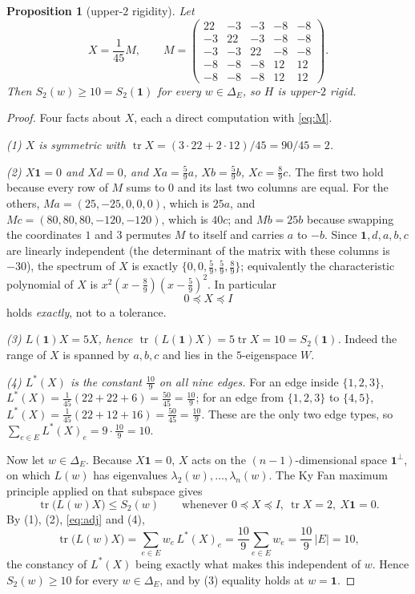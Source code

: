 \documentclass[11pt]{amsart}
\newtheorem{proposition}[theorem]{Proposition}
\theoremstyle{remark}
\DeclareMathOperator{\tr}{tr}
\newcommand{\DeltaE}{\Delta_E}
\newcommand{\Lop}{L}
\newcommand{\Ladj}{L^{*}}
\begin{document}
\begin{proposition}[upper-$2$ rigidity]\label{prop:upper2}
Let
\begin{equation}\label{eq:M}
 X=\frac{1}{45}M,
 \qquad
 M=\begin{pmatrix}
  22 & -3 & -3 & -8 & -8\\
  -3 & 22 & -3 & -8 & -8\\
  -3 & -3 & 22 & -8 & -8\\
  -8 & -8 & -8 & 12 & 12\\
  -8 & -8 & -8 & 12 & 12
 \end{pmatrix}.
\end{equation}
Then $S_2(w)\ge10=S_2(\mathbf 1)$ for every $w\in\DeltaE$, so $H$ is upper-$2$ rigid.
\end{proposition}

\begin{proof}
Four facts about $X$, each a direct computation with \eqref{eq:M}.

\emph{(1) $X$ is symmetric with $\tr X=(3\cdot22+2\cdot12)/45=90/45=2$.}

\emph{(2) $X\mathbf 1=0$ and $Xd=0$, and $Xa=\tfrac59a$, $Xb=\tfrac59b$,
$Xc=\tfrac89c$.} The first two hold because every row of $M$ sums to $0$ and its last two
columns are equal. For the others, $Ma=(25,-25,0,0,0)$, which is $25a$, and
$Mc=(80,80,80,-120,-120)$, which is $40c$; and $Mb=25b$ because swapping the coordinates
$1$ and $3$ permutes $M$ to itself and carries $a$ to $-b$. Since $\mathbf 1,d,a,b,c$ are linearly
independent (the determinant of the matrix with these columns is $-30$), the spectrum of
$X$ is exactly $\{0,0,\tfrac59,\tfrac59,\tfrac89\}$; equivalently the characteristic
polynomial of $X$ is $x^2(x-\tfrac89)(x-\tfrac59)^2$. In particular
\[
 0\preceq X\preceq I
\]
holds \emph{exactly}, not to a tolerance.

\emph{(3) $\Lop(\mathbf 1)X=5X$, hence $\tr(\Lop(\mathbf 1)X)=5\tr X=10=S_2(\mathbf 1)$.}
Indeed the range of $X$ is spanned by $a,b,c$ and lies in the $5$-eigenspace $W$.

\emph{(4) $\Ladj(X)$ is the constant $\tfrac{10}{9}$ on all nine edges.} For an edge inside
$\{1,2,3\}$, $\Ladj(X)=\tfrac{1}{45}(22+22+6)=\tfrac{50}{45}=\tfrac{10}{9}$; for an edge
from $\{1,2,3\}$ to $\{4,5\}$, $\Ladj(X)=\tfrac{1}{45}(22+12+16)=\tfrac{50}{45}=\tfrac{10}{9}$.
These are the only two edge types, so
$\sum_{e\in E}\Ladj(X)_e=9\cdot\tfrac{10}{9}=10$.

Now let $w\in\DeltaE$. Because $X\mathbf 1=0$, $X$ acts on the $(n-1)$-dimensional space
$\mathbf 1^{\perp}$, on which $\Lop(w)$ has eigenvalues $\lambda_2(w),\dots,\lambda_n(w)$.
The Ky Fan maximum principle \cite{Fan} applied on that subspace gives
\[
 \tr\bigl(\Lop(w)X\bigr)\le S_2(w)
 \qquad\text{whenever } 0\preceq X\preceq I,\ \tr X=2,\ X\mathbf 1=0 .
\]
By (1), (2), \eqref{eq:adj} and (4),
\[
 \tr\bigl(\Lop(w)X\bigr)=\sum_{e\in E}w_e\,\Ladj(X)_e=\frac{10}{9}\sum_{e\in E}w_e
 =\frac{10}{9}\,|E|=10 ,
\]
the constancy of $\Ladj(X)$ being exactly what makes this independent of $w$. Hence
$S_2(w)\ge10$ for every $w\in\DeltaE$, and by (3) equality holds at $w=\mathbf 1$.
\end{proof}
\end{document}

